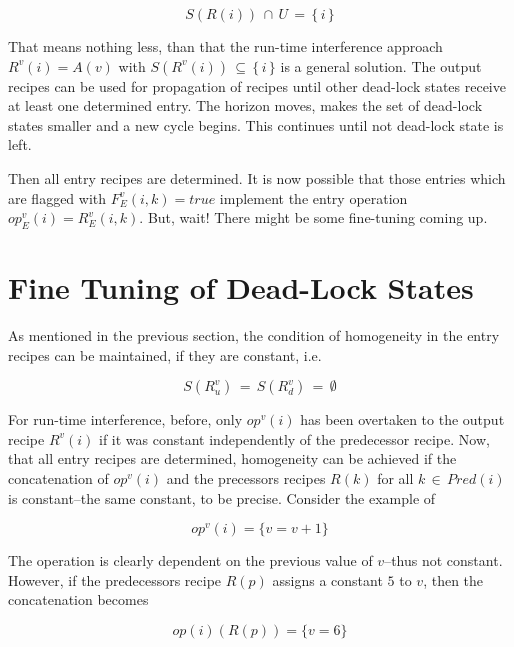 \documentclass[12pt,a4paper]{scrartcl}
\begin{document}
\begin{equation}
    S(R(i))\,\cap\,U\,=\,\{\,i\,\}
\end{equation}

That means nothing less, than that the run-time interference approach
$R^v(i)=A(v)$ with $S(R^v(i))\,\subseteq\,\{\,i\,\}$ is a general solution.
The output recipes can be used for propagation of recipes until other dead-lock
states receive at least one determined entry. The horizon moves, makes the
set of dead-lock states smaller and a new cycle begins. This continues until
not dead-lock state is left. 

Then all entry recipes are determined. It is now possible that those entries
which are flagged with $F_E^v(i,k)=true$ implement the entry operation
$op_E^v(i)=R_E^v(i,k)$. But, wait! There might be some fine-tuning coming up.


%
\section{Fine Tuning of Dead-Lock States}

As mentioned in the previous section, the condition of homogeneity in the
entry recipes can be maintained, if they are constant, i.e.

\begin{equation}
     S(R^v_u)\,=\,S(R^v_d)\,=\,\emptyset   
\end{equation}

For run-time interference, before, only $op^v(i)$ has been overtaken to the
output recipe $R^v(i)$ if it was constant independently of the predecessor
recipe. Now, that all entry recipes are determined, homogeneity can be achieved
if the concatenation of $op^v(i)$ and the precessors recipes $R(k)$ for all
$k\,\in\,Pred(i)$ is constant--the same constant, to be precise.  Consider the
example of 

\begin{equation}
                       op^v(i) = \{ v = v + 1 \}
\end{equation}

The operation is clearly dependent on the previous value of $v$--thus not
constant. However, if the predecessors recipe $R(p)$ assigns a constant $5$ to
$v$, then the concatenation becomes

\begin{equation}
                       op(i)(R(p)) = \{ v = 6 \}
\end{equation}
\end{document}
